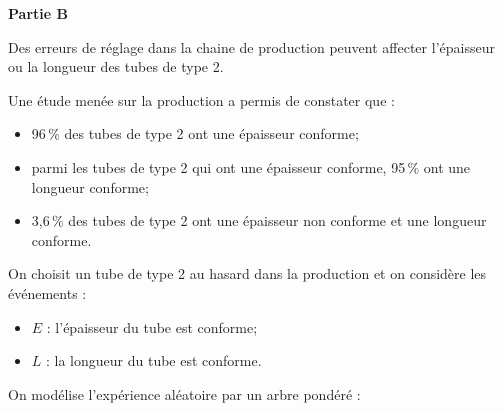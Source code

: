 \documentclass[10pt]{article}
\begin{document}
\bigskip 

\textbf{Partie B}

\medskip

Des erreurs de réglage dans la chaine de production peuvent affecter l'épaisseur ou la longueur des tubes de type 2.

Une étude menée sur la production a permis de constater que :

\begin{itemize}
	\item 96\,\% des tubes de type 2 ont une épaisseur conforme;	
	\item parmi les tubes de type 2 qui ont une épaisseur conforme, 95\,\% ont une longueur conforme;	
	\item 3,6\,\% des tubes de type 2 ont une épaisseur non conforme et une longueur conforme.
\end{itemize}

On choisit un tube de type 2 au hasard dans la production et on considère les événements :

\begin{itemize}
	\item $E$ : \og{}l'épaisseur du tube est conforme\fg{};
	\item $L$ : \og{}la longueur du tube est conforme\fg{}.
\end{itemize}

On modélise l'expérience aléatoire par un arbre pondéré :

\begin{center}
\end{center}
\end{document}
